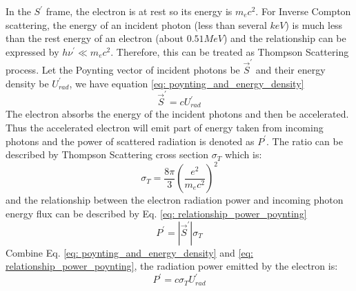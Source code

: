 \documentclass[12pt]{report}
\begin{document}
            In the $S^{\prime}$ frame, the electron is at rest so its energy is $m_e c^2$. 
            For Inverse Compton scattering, the energy of an incident photon (less than several $keV$) 
            is much less than the rest energy of an electron (about $0.51MeV$) 
            and the relationship can be expressed by 
            $h\nu^{\prime} \ll m_e c^2$. Therefore, this can be treated as Thompson Scattering process. 
            Let the Poynting vector of incident photons be $\vec{S}^{\prime}$ and their energy density 
            be $U_{rad}^{\prime}$, we have equation \ref{eq: poynting_and_energy_density}
            \begin{equation}
              \label{eq: poynting_and_energy_density}
              \vec{S}^{\prime} = c U_{rad}^{\prime}
            \end{equation}
            The electron absorbs the energy of the incident photons and then be accelerated. Thus the 
            accelerated electron will emit part of energy taken from incoming photons and the power of 
            scattered radiation is denoted as $P^{\prime}$.
            The ratio can be described by Thompson Scattering cross section $\sigma_{T}$ which is:
            \begin{equation}
              \label{eq: thompson_cross_section}
              \sigma_{T} = \frac{8\pi}{3} \left(\frac{e^2}{m_e c^2}\right)^2
            \end{equation}
            and the relationship between the electron radiation power and incoming photon energy flux can be 
            described by Eq. \ref{eq: relationship_power_poynting}
            \begin{equation}
              \label{eq: relationship_power_poynting}
              P^{\prime} = \left| \vec{S}^{\prime} \right| \sigma_{T}
            \end{equation}
            Combine Eq. \ref{eq: poynting_and_energy_density} and \ref{eq: relationship_power_poynting},
            the radiation power emitted by the electron is: 
            \begin{equation}
              \label{eq: final_relationship}
              P^{\prime} = c \sigma_{T} U^{\prime}_{rad}
            \end{equation}
\end{document}
